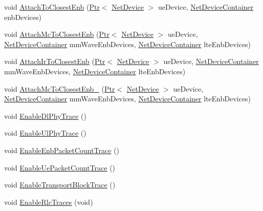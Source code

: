 \begin{DoxyCompactItemize}
\item 
void \hyperlink{classns3_1_1MmWaveHelper_a10d1215d5a0e59e471a2a062ffa9f274}{Attach\+To\+Closest\+Enb} (\hyperlink{classns3_1_1Ptr}{Ptr}$<$ \hyperlink{classns3_1_1NetDevice}{Net\+Device} $>$ ue\+Device, \hyperlink{classns3_1_1NetDeviceContainer}{Net\+Device\+Container} enb\+Devices)
\item 
void \hyperlink{classns3_1_1MmWaveHelper_ab071490fd7b33a01933e274fa2a29415}{Attach\+Mc\+To\+Closest\+Enb} (\hyperlink{classns3_1_1Ptr}{Ptr}$<$ \hyperlink{classns3_1_1NetDevice}{Net\+Device} $>$ ue\+Device, \hyperlink{classns3_1_1NetDeviceContainer}{Net\+Device\+Container} mm\+Wave\+Enb\+Devices, \hyperlink{classns3_1_1NetDeviceContainer}{Net\+Device\+Container} lte\+Enb\+Devices)
\item 
void \hyperlink{classns3_1_1MmWaveHelper_abb0df4557a8d7d5b7838e3602a1ddb97}{Attach\+Ir\+To\+Closest\+Enb} (\hyperlink{classns3_1_1Ptr}{Ptr}$<$ \hyperlink{classns3_1_1NetDevice}{Net\+Device} $>$ ue\+Device, \hyperlink{classns3_1_1NetDeviceContainer}{Net\+Device\+Container} mm\+Wave\+Enb\+Devices, \hyperlink{classns3_1_1NetDeviceContainer}{Net\+Device\+Container} lte\+Enb\+Devices)
\item 
void \hyperlink{classns3_1_1MmWaveHelper_abb13627c4d58e805672cccebd7716559}{Attach\+Mc\+To\+Closest\+Enb\+\_} (\hyperlink{classns3_1_1Ptr}{Ptr}$<$ \hyperlink{classns3_1_1NetDevice}{Net\+Device} $>$ ue\+Device, \hyperlink{classns3_1_1NetDeviceContainer}{Net\+Device\+Container} mm\+Wave\+Enb\+Devices, \hyperlink{classns3_1_1NetDeviceContainer}{Net\+Device\+Container} lte\+Enb\+Devices)
\item 
void \hyperlink{classns3_1_1MmWaveHelper_a895ce8f9e09180999e218df50b64be8b}{Enable\+Dl\+Phy\+Trace} ()
\item 
void \hyperlink{classns3_1_1MmWaveHelper_a046835b8c6ef6a0b72d575fc4aa31d5a}{Enable\+Ul\+Phy\+Trace} ()
\item 
void \hyperlink{classns3_1_1MmWaveHelper_a015fad19d759ca57ea6e92076e3b85e8}{Enable\+Enb\+Packet\+Count\+Trace} ()
\item 
void \hyperlink{classns3_1_1MmWaveHelper_a0ee04abfa91d9bb6fd192069533fa641}{Enable\+Ue\+Packet\+Count\+Trace} ()
\item 
void \hyperlink{classns3_1_1MmWaveHelper_a0a0d158da906b074f19dc2ad76b6b1ce}{Enable\+Transport\+Block\+Trace} ()
\item 
void \hyperlink{classns3_1_1MmWaveHelper_a30420de7d26cf2f3835c4d6afbaba139}{Enable\+Rlc\+Traces} (void)
\item 

\end{DoxyCompactItemize}
